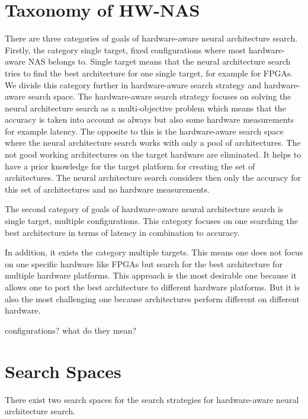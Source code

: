 \documentclass[conference]{IEEEtran}
\begin{document}
\section{Taxonomy of HW-NAS}
There are three categories of goals of hardware-aware neural architecture search. Firstly, the category single target, fixed configurations where most hardware-aware NAS belongs to. Single target means that the neural architecture search tries to find the best architecture for one single target, for example for FPGAs. We divide this category further in hardware-aware search strategy and hardware-aware search space. The hardware-aware search strategy focuses on solving the neural architecture search as a multi-objective problem which means that the accuracy is taken into account as always but also some hardware measurements for example latency. The opposite to this is the hardware-aware search space where the neural architecture search works with only a pool of architectures. The not good working architectures on the target hardware are eliminated. It helps to have a prior knowledge for the target platform for creating the set of architectures. The neural architecture search considers then only the accuracy for this set of architectures and no hardware measurements.

The second category of goals of hardware-aware neural architecture search is single target, multiple configurations. This category focuses on one searching the best architecture in terms of latency in combination to accuracy. 

In addition, it exists the category multiple targets. This means one does not focus on one specific hardware like FPGAs but search for the best architecture for multiple hardware platforms. This approach is the most desirable one because it allows one to port the best architecture to different hardware platforms. But it is also the most challenging one because architectures perform different on different hardware. 

configurations? what do they mean?

\section{Search Spaces}

There exist two search spaces for the search strategies for hardware-aware neural architecture search. 
\end{document}
